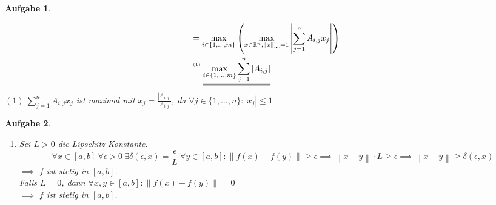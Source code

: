 \documentclass[11pt]{article}
\theoremstyle{break}
\newtheorem{task}{Aufgabe}
\newcommand{\set}[1]{\ensuremath{\{#1\}}}
\newcommand{\abs}[1]{\ensuremath{\left\vert #1 \right\vert}}
\newcommand{\norm}[1]{\ensuremath{\left\| #1 \right\|}}
\newcommand{\R}{\ensuremath{\mathbb{R}}}
\begin{document}
\begin{task}
\begin{enumerate} [label={(\alph*)}]
\begin{align*}
            &= \max\limits_{i\in\set{1,\dots,m}}\left(\max\limits_{x\in \R^n, \norm{x}_\infty = 1}\abs{\sum\limits_{j=1}^n A_{i,j}x_j}\right)\\
            &\stackrel{\mbox{\tiny (1)}}{=} \underline{\underline{\max\limits_{i\in\set{1,\dots,m}}\sum\limits_{j=1}^n \abs{A_{i,j}}}}
        \end{align*}
        $(1)\ \sum\limits_{j=1}^n A_{i,j}x_j$ ist maximal mit $x_j = \frac{\abs{A_{i,j}}}{A_{i,j}}$, da $\forall j\in\set{1,\dots,n}:\abs{x_j}\leq 1$
    \end{enumerate}
\end{task}

\begin{task}
    \hfill\vspace{-5mm}
    \begin{enumerate} [label={(\alph*)}]
        \item Sei $L>0$ die Lipschitz-Konstante. $$\forall x\in [a,b]\ \forall \epsilon>0\ \exists \delta(\epsilon, x)=\frac{\epsilon}{L}\ \forall y\in [a,b]: \norm{f(x)-f(y)} \geq \epsilon \implies \norm{x-y}\cdot L \geq \epsilon \implies \norm{x-y}\geq\delta(\epsilon, x)$$
        $\implies$ $f$ ist stetig in $[a,b]$.\vspace{3mm}\\
        Falls $L=0$, dann $\forall x,y\in [a,b]: \norm{f(x)-f(y)}=0$\\
        $\implies$ $f$ ist stetig in $[a,b]$.
    \end{enumerate}
\end{task}
\end{document}
